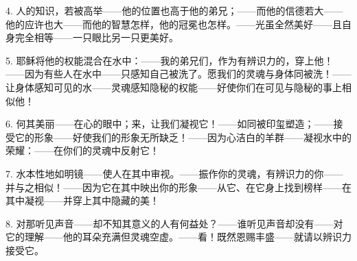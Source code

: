 4. 人的知识，若被高举——\newline{}他的位置也高于他的弟兄；——\newline{}而他的信德若大——\newline{}他的应许也大——\newline{}而他的智慧怎样，他的冠冕也怎样。——\newline{}光虽全然美好——\newline{}且自身完全相等——\newline{}一只眼比另一只更美好。\par

5. 耶稣将他的权能混合在水中：——\newline{}我的弟兄们，作为有辨识力的，穿上他！——\newline{}因为有些人在水中——\newline{}只感知自己被洗了。愿我们的灵魂与身体同被洗！——\newline{}让身体感知可见的水——\newline{}灵魂感知隐秘的权能——\newline{}好使你们在可见与隐秘的事上相似他！\par

6. 何其美丽——\newline{}在心的眼中；来，让我们凝视它！——\newline{}如同被印玺塑造；——\newline{}接受它的形象——\newline{}好使我们的形象无所缺乏！——\newline{}因为心洁白的羊群——\newline{}凝视水中的荣耀：——\newline{}在你们的灵魂中反射它！\par

7. 水本性地如明镜——\newline{}使人在其中审视。——\newline{}振作你的灵魂，有辨识力的你——\newline{}并与之相似！——\newline{}因为它在其中映出你的形象——\newline{}从它、在它身上找到榜样——\newline{}在其中凝视——\newline{}并穿上其中隐藏的美！\par

8. 对那听见声音——\newline{}却不知其意义的人有何益处？——\newline{}谁听见声音却没有——\newline{}对它的理解——\newline{}他的耳朵充满但灵魂空虚。——\newline{}看！既然恩赐丰盛——\newline{}就请以辨识力接受它。\par


